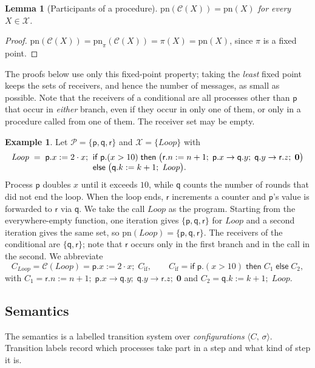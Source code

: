 \documentclass[11pt]{article}
\theoremstyle{plain}
\newtheorem{lemma}[theorem]{Lemma}
\theoremstyle{definition}
\newtheorem{example}[theorem]{Example}
\theoremstyle{remark}
\newcommand{\kw}[1]{\mathsf{#1}}
\newcommand{\kif}{\kw{if}\;}
\newcommand{\kthen}{\;\kw{then}\;}
\newcommand{\kelse}{\;\kw{else}\;}
\newcommand{\nil}{\mathbf{0}}
\newcommand{\seq}{;\;}
\newcommand{\pp}{\mathsf{p}}
\newcommand{\qq}{\mathsf{q}}
\newcommand{\rr}{\mathsf{r}}
\newcommand{\Procs}{\mathcal{P}}
\newcommand{\pn}{\mathrm{pn}}
\newcommand{\conf}[2]{\langle #1,\, #2\rangle}
\newcommand{\ifcond}[3]{\kif #1 \kthen #2 \kelse #3}
\newcommand{\Pnames}{\mathcal{X}}
\newcommand{\Defs}{\mathcal{C}}
\newcommand{\body}[1]{\Defs(#1)}
\newcommand{\Loop}{\mathit{Loop}}
\newcommand{\Cif}{C_{\mathrm{if}}}
\newcommand{\CL}{C_{\Loop}}
\begin{document}
\begin{lemma}[Participants of a procedure]\label{lem:pn-body}
  $\pn(\body{X}) = \pn(X)$ for every $X\in\Pnames$.
\end{lemma}
\begin{proof}
  $\pn(\body{X}) = \pn_\pi(\body{X}) = \pi(X) = \pn(X)$, since $\pi$ is a
  fixed point.
\end{proof}

The proofs below use only this fixed-point property; taking the \emph{least}
fixed point keeps the sets of receivers, and hence the number of messages, as
small as possible.  Note that the receivers of a conditional are all
processes other than $\pp$ that occur in \emph{either} branch, even if they
occur in only one of them, or only in a procedure called from one of them.
The receiver set may be empty.

\begin{example}\label{ex:chor}
  Let $\Procs = \{\pp,\qq,\rr\}$ and $\Pnames = \{\Loop\}$ with
  \[
  \begin{array}{l@{\;}l}
    \Loop \;=\; \pp.x := 2\cdot x \seq
    & \kif \pp.(x > 10) \kthen
       \big(\rr.n := n+1 \seq \pp.x \to \qq.y \seq \qq.y \to \rr.z \seq \nil\big)\\
    & \kw{else}\; \big(\qq.k := k+1 \seq \Loop\big).
  \end{array}
  \]
  Process $\pp$ doubles $x$ until it exceeds $10$, while $\qq$ counts the
  number of rounds that did not end the loop.  When the loop ends, $\rr$
  increments a counter and $\pp$'s value is forwarded to $\rr$ via $\qq$.  We
  take the call $\Loop$ as the program.  Starting from the everywhere-empty
  function, one iteration gives $\{\pp,\qq,\rr\}$ for $\Loop$ and a second
  iteration gives the same set, so $\pn(\Loop) = \{\pp,\qq,\rr\}$.  The
  receivers of the conditional are $\{\qq,\rr\}$; note that $\rr$ occurs only
  in the first branch and in the call in the second.  We abbreviate
  \[
    \CL = \body{\Loop} = \pp.x := 2\cdot x \seq \Cif,
    \qquad
    \Cif = \ifcond{\pp.(x>10)}{C_1}{C_2},
  \]
  with $C_1 = \rr.n := n+1 \seq \pp.x \to \qq.y \seq \qq.y \to \rr.z \seq \nil$
  and $C_2 = \qq.k := k+1 \seq \Loop$.
\end{example}

\subsection{Semantics}
\label{sec:chor-sem}

The semantics is a labelled transition system over \emph{configurations}
$\conf{C}{\sigma}$.  Transition labels record which processes take part in a
step and what kind of step it is.
\end{document}
